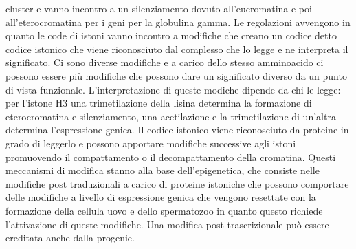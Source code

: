 cluster e vanno incontro a un silenziamento dovuto all'eucromatina e poi all'eterocromatina per i geni per la globulina gamma. Le regolazioni avvengono in quanto le code di istoni 
vanno incontro a modifiche che creano un codice detto codice istonico che viene riconosciuto dal complesso che lo legge e ne interpreta il significato. Ci sono diverse modifiche e a
carico dello stesso amminoacido ci possono essere pi\`u modifiche che possono dare un significato diverso da un punto di vista funzionale. L'interpretazione di queste modiche dipende da 
chi le legge: per l'istone H3 una trimetilazione della lisina determina la formazione di eterocromatina e silenziamento, una acetilazione e la trimetilazione di un'altra determina 
l'espressione genica. Il codice istonico viene riconosciuto da proteine in grado di leggerlo e possono apportare modifiche successive agli istoni promuovendo il compattamento o il 
decompattamento della cromatina. Questi meccanismi di modifica stanno alla base dell'epigenetica, che consiste nelle modifiche post traduzionali a carico di proteine istoniche che possono
comportare delle modifiche a livello di espressione genica che vengono resettate con la formazione della cellula uovo e dello spermatozoo in quanto questo richiede l'attivazione di 
queste modifiche. Una modifica post trascrizionale pu\`o essere ereditata anche dalla progenie. 
